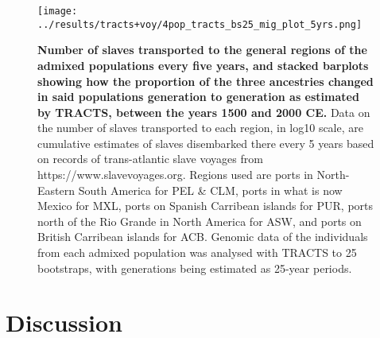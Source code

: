 \documentclass[11pt]{article}
\begin{document}
\begin{figure}[htb!]%
    \centering
    \texttt{[image: 
        ../results/tracts+voy/4pop\_tracts\_bs25\_mig\_plot\_5yrs.png]}
    \vspace{-.2cm}
    \caption{\textbf{
        Number of slaves transported to the general regions of the admixed populations every five years, and stacked barplots showing how the proportion of the three ancestries changed in said populations generation to generation as estimated by TRACTS, between the years 1500 and 2000 CE.
    }
        Data on the number of slaves transported to each region, in log10 scale, are cumulative estimates of slaves disembarked there every 5 years based on records of trans-atlantic slave voyages from https://www.slavevoyages.org. Regions used are ports in North-Eastern South America for PEL \& CLM, ports in what is now Mexico for MXL, ports on Spanish Carribean islands for PUR, ports north of the Rio Grande in North America for ASW, and ports on British Carribean islands for ACB. Genomic data of the individuals from each admixed population was analysed with TRACTS to 25 bootstraps, with generations being estimated as 25-year periods.
    }
\end{figure}





\vspace{8mm}
\section{Discussion}


\end{document}

